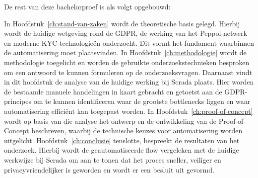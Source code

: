De rest van deze bachelorproef is als volgt opgebouwd:

In Hoofdstuk~\ref{ch:stand-van-zaken} wordt de theoretische basis gelegd. Hierbij wordt de huidige wetgeving rond de GDPR, de werking van het Peppol-netwerk en moderne KYC-\-technologieën onderzocht. Dit vormt het fundament waarbinnen de automatisering moet plaatsvinden.
In Hoofdstuk~\ref{ch:methodologie} wordt de methodologie toegelicht en worden de gebruikte onderzoekstechnieken besproken om een antwoord te kunnen formuleren op de onderzoeksvragen. Daarnaast vindt in dit hoofdstuk de analyse van de huidige werking bij Scrada plaats. 
Hier worden de bestaande manuele handelingen in kaart gebracht en getoetst aan de GDPR-principes om te kunnen identificeren waar de grootste bottlenecks liggen en waar automatisering efficiënt kan toegepast worden.
In Hoofdstuk~\ref{ch:proof-of-concept} wordt op basis van die analyse het ontwerp en de ontwikkeling van de Proof-of-Concept beschreven, waarbij de technische keuzes voor automatisering worden uitgelicht.
Hoofdstuk~\ref{ch:conclusie} tenslotte, bespreekt de resultaten van het onderzoek. Hierbij wordt de geautomatiseerde flow vergeleken met de huidige werkwijze bij Scrada om aan te tonen dat het proces sneller, veiliger en privacyvriendelijker is geworden en wordt er een besluit uit gevormd.